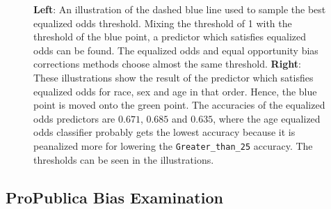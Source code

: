 \documentclass[11pt, fleqn, titlepage]{article}
\begin{document}
\begin{figure}[H]
\begin{subfigure}{0.5\textwidth}
		\end{subfigure}
		\caption{\textbf{Left}: An illustration of the dashed blue line used to sample the best equalized odds threshold. Mixing the threshold of 1 with the threshold of the blue point, a predictor which satisfies equalized odds can be found. The equalized odds and equal opportunity bias corrections methods choose almost the same threshold.  \textbf{Right}: These illustrations show the result of the predictor which satisfies equalized odds for race, sex and age in that order. Hence, the blue point is moved onto the green point. The accuracies of the equalized odds predictors are $0.671$, $0.685$ and $0.635$, where the age equalized odds classifier probably gets the lowest accuracy because it is peanalized more for lowering the \texttt{Greater\_than\_{25}} accuracy. The thresholds can be seen in the illustrations.}
		\label{fig:equalizedOdds}
	\end{figure}
	
	\subsection{ProPublica Bias Examination}\label{propub}
	
\end{document}
